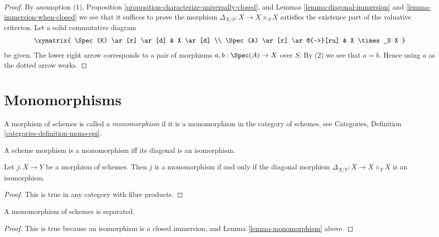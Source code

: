 \begin{proof}
By assumption (1),
Proposition \ref{proposition-characterize-universally-closed}, and
Lemmas \ref{lemma-diagonal-immersion} and \ref{lemma-immersion-when-closed}
we see that it suffices to prove the morphism
$\Delta_{X/S} : X \to X \times_S X$ satisfies the existence
part of the valuative criterion.
Let a solid commutative diagram
$$
\xymatrix{
\Spec(K) \ar[r] \ar[d] & X \ar[d] \\
\Spec(A) \ar[r] \ar@{-->}[ru] & X \times_S X
}
$$
be given. The lower right arrow corresponds to a
pair of morphisms $a, b : \Spec(A) \to X$ over $S$.
By (2) we see that $a = b$. Hence using $a$ as the dotted
arrow works.
\end{proof}





\section{Monomorphisms}
\label{section-monomorphisms}

\begin{definition}
\label{definition-monomorphism}
A morphism of schemes is called a {\it monomorphism} if it is
a monomorphism in the category of schemes, see
Categories, Definition \ref{categories-definition-mono-epi}.
\end{definition}

\begin{lemma}
\label{lemma-monomorphism}
\begin{slogan}
A scheme morphism is a monomorphism iff its diagonal is an isomorphism.
\end{slogan}
Let $j : X \to Y$ be a morphism of schemes.
Then $j$ is a monomorphism if and only if the
diagonal morphism $\Delta_{X/Y} : X \to X \times_Y X$ is
an isomorphism.
\end{lemma}

\begin{proof}
This is true in any category with fibre products.
\end{proof}

\begin{lemma}
\label{lemma-monomorphism-separated}
A monomorphism of schemes is separated.
\end{lemma}

\begin{proof}
This is true because an isomorphism is a closed immersion,
and Lemma \ref{lemma-monomorphism} above.
\end{proof}


